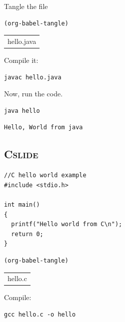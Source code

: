 \documentclass[11pt]{article}
\begin{document}
Tangle the file

\begin{verbatim}
(org-babel-tangle)
\end{verbatim}

\begin{center}
\begin{tabular}{l}
hello.java\\
\end{tabular}
\end{center}


Compile it:
\begin{verbatim}
javac hello.java
\end{verbatim}

Now, run the code.

\begin{verbatim}
java hello
\end{verbatim}

\begin{verbatim}
Hello, World from java
\end{verbatim}


\subsection{C\hfill{}\textsc{slide}}
\label{sec-11-6}

\begin{verbatim}
//C hello world example
#include <stdio.h>

int main()
{
  printf("Hello world from C\n");
  return 0;
}
\end{verbatim}

\begin{verbatim}
(org-babel-tangle)
\end{verbatim}

\begin{center}
\begin{tabular}{l}
hello.c\\
\end{tabular}
\end{center}

Compile:

\begin{verbatim}
gcc hello.c -o hello
\end{verbatim}
\end{document}
